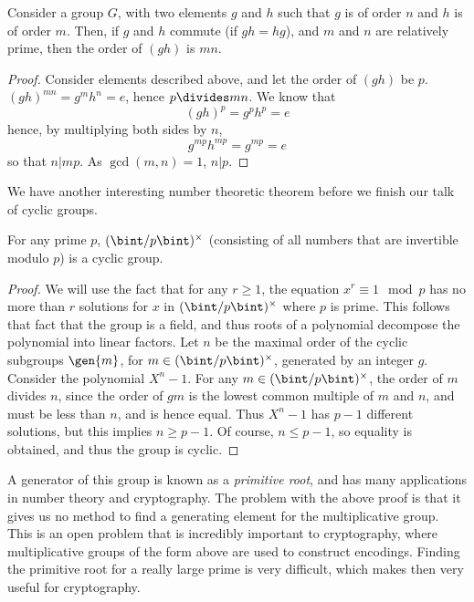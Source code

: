 \begin{theorem}
    Consider a group $G$, with two elements $g$ and $h$ such that $g$ is of order $n$ and $h$ is of order $m$. Then, if $g$ and $h$ commute (if $gh = hg$), and $m$ and $n$ are relatively prime, then the order of $(gh)$ is $mn$.
\end{theorem}
\begin{proof}
    Consider elements described above, and let the order of $(gh)$ be $p$. $(gh)^{mn} = g^mh^n = e$, hence $p \divides mn$. We know that
    \[ (gh)^p = g^ph^p = e \]
    hence, by multiplying both sides by $n$,
    \[ g^{mp}h^{mp} = g^{mp} = e \]
    so that $n | mp$. As $\gcd(m,n) = 1$, $n | p$.
\end{proof}

We have another interesting number theoretic theorem before we finish our talk of cyclic groups.

\begin{theorem}
    For any prime $p$, $(\bint/p\bint)^\times$ (consisting of all numbers that are invertible modulo $p$) is a cyclic group.
\end{theorem}
\begin{proof}
    We will use the fact that for any $r \geq 1$, the equation $x^r \equiv 1 \mod{p}$ has no more than $r$ solutions for $x$ in $(\bint/p\bint)^\times$ where $p$ is prime. This follows that fact that the group is a field, and thus roots of a polynomial decompose the polynomial into linear factors. Let $n$ be the maximal order of the cyclic subgroups $\gen{m}$, for $m \in (\bint/p\bint)^\times$, generated by an integer $g$. Consider the polynomial $X^n - 1$. For any $m \in (\bint/p\bint)^\times$, the order of $m$ divides $n$, since the order of $gm$ is the lowest common multiple of $m$ and $n$, and must be less than $n$, and is hence equal. Thus $X^n - 1$ has $p - 1$ different solutions, but this implies $n \geq p - 1$. Of course, $n \leq p - 1$, so equality is obtained, and thus the group is cyclic.
\end{proof}

A generator of this group is known as a \emph{primitive root}, and has many applications in number theory and cryptography. The problem with the above proof is that it gives us no method to find a generating element for the multiplicative group. This is an open problem that is incredibly important to cryptography, where multiplicative groups of the form above are used to construct encodings. Finding the primitive root for a really large prime is very difficult, which makes then very useful for cryptography.



